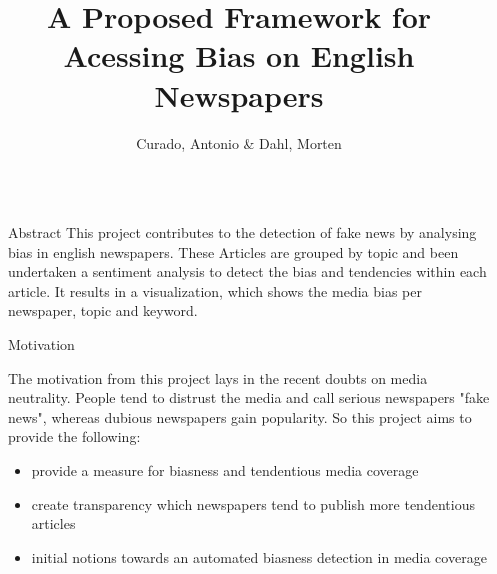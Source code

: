 \documentclass[final]{beamer}
\title{A Proposed Framework for Acessing Bias on English Newspapers {\emoji[ios]{1F4F0}}} %
\author{Curado, Antonio  \&  Dahl, Morten} %
\institute{Masters in Advanced Analytics @ Nova IMS} %
\newlength{\sepwid}
\newlength{\onecolwid}
\begin{document}

\setlength{\belowcaptionskip}{2ex} %
\setlength\belowdisplayshortskip{2ex} %

\begin{frame}[t] %

\begin{columns}[t] %

\begin{column}{\sepwid}\end{column} %

\begin{column}{\onecolwid} %



\begin{block}{Abstract}
    This project contributes to the detection of fake news by analysing bias in english newspapers. These Articles are grouped by topic and been undertaken a sentiment analysis to detect the bias and tendencies within each article. It results in a visualization, which shows the media bias per newspaper, topic and keyword.
\end{block}



\begin{block}{Motivation {}}

    The motivation from this project lays in the recent doubts on media neutrality. People tend to distrust the media and call serious newspapers "fake news", whereas dubious newspapers gain popularity. So this project aims to provide the following:
    \begin{itemize}
        \item provide a measure for biasness and tendentious media coverage
        \item create transparency which newspapers tend to publish more tendentious articles
        \item initial notions towards an automated biasness detection in media coverage
    \end{itemize}


\end{block}
\end{column}
\end{columns}
\end{frame}
\end{document}
